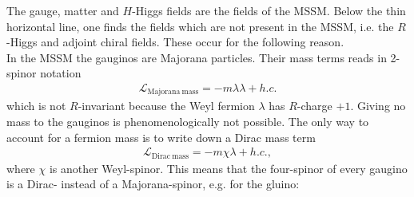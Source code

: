 The gauge, matter and $H$-Higgs fields are the fields of the MSSM. Below the thin horizontal line, one finds the fields which are not present in the MSSM, i.e. the $R$-Higgs and adjoint chiral fields. These occur for the following reason.\\
In the MSSM the gauginos are Majorana particles. Their mass terms  reads in 2-spinor notation
\begin{align}
\mathcal{L}_{\mathrm{Majorana\ mass}} = -m\lambda\lambda + h.c.
\end{align}
which is not $R$-invariant because the Weyl fermion $\lambda$ has $R$-charge $+1$. Giving no mass to the gauginos is phenomenologically not possible. The only way to account for a fermion mass is to write down a Dirac mass term
\begin{align}
\mathcal{L}_{\mathrm{Dirac\ mass}} = -m \chi\lambda + h.c.,
\end{align}
where $\chi$ is another Weyl-spinor. This means that the four-spinor of every gaugino is a Dirac- instead of a Majorana-spinor, e.g. for the gluino:
